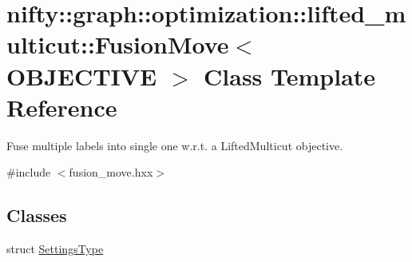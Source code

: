 \hypertarget{classnifty_1_1graph_1_1optimization_1_1lifted__multicut_1_1FusionMove}{}\section{nifty\+:\+:graph\+:\+:optimization\+:\+:lifted\+\_\+multicut\+:\+:Fusion\+Move$<$ O\+B\+J\+E\+C\+T\+I\+V\+E $>$ Class Template Reference}
\label{classnifty_1_1graph_1_1optimization_1_1lifted__multicut_1_1FusionMove}


Fuse multiple labels into single one w.\+r.\+t. a Lifted\+Multicut objective.  




{\ttfamily \#include $<$fusion\+\_\+move.\+hxx$>$}

\subsection*{Classes}
\begin{DoxyCompactItemize}
\item 
struct \hyperlink{structnifty_1_1graph_1_1optimization_1_1lifted__multicut_1_1FusionMove_1_1SettingsType}{Settings\+Type}
\end{DoxyCompactItemize}
